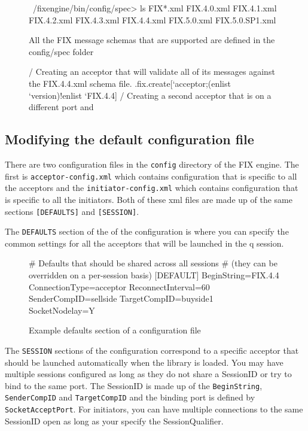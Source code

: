 \begin{figure}[H]
\begin{qcode}
~/fixengine/bin/config/spec> ls FIX*.xml
FIX.4.0.xml
FIX.4.1.xml
FIX.4.2.xml
FIX.4.3.xml
FIX.4.4.xml
FIX.5.0.xml
FIX.5.0.SP1.xml
\end{qcode}
\caption{All the FIX message schemas that are supported are defined in the config/spec folder}
\end{figure}

\begin{figure}[H]
\begin{qcode}
/ Creating an acceptor that will validate all of its messages against the FIX.4.4.xml schema file.
.fix.create[`acceptor;(enlist `version)!enlist `FIX.4.4]
/ Creating a second acceptor that is on a different port and 
\end{qcode}
\caption{}
\end{figure}

\subsection{Modifying the default configuration file}
There are two configuration files in the \verb|config| directory of the FIX engine. The first
is \verb|acceptor-config.xml| which contains configuration that is specific to all the acceptors
and the \verb|initiator-config.xml| which contains configuration that is specific to all the initiators. Both of these xml files are made up of the same sections \verb|[DEFAULTS]| and \verb|[SESSION]|. 

The \verb|DEFAULTS| section of the of the configuration is where you can specify the common settings for all the acceptors that will be launched in the q session.

\begin{figure}[H]
\begin{inicode}
# Defaults that should be shared across all sessions
# (they can be overridden on a per-session basis)
[DEFAULT]
BeginString=FIX.4.4
ConnectionType=acceptor
ReconnectInterval=60
SenderCompID=sellside
TargetCompID=buyside1
SocketNodelay=Y
\end{inicode}
\caption{Example defaults section of a configuration file}
\end{figure}

The \verb|SESSION| sections of the configuration correspond to a specific acceptor that should be 
launched automatically when the library is loaded. You may have multiple sessions configured as long
as they do not share a SessionID or try to bind to the same port. The SessionID is made up of the \verb|BeginString|, \verb|SenderCompID| and \verb|TargetCompID| and the binding port is defined by
\verb|SocketAcceptPort|. For initiators, you can have multiple connections to the same SessionID open as long as your specify the SessionQualifier. 

